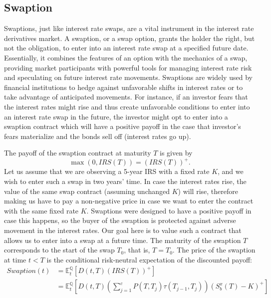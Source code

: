 \documentclass[titlepage, 12pt]{article}
\newcommand{\condexpect}[3]{\mathbb{E}^\mathbb{#1}_{#2}\left[#3\right]}
\begin{document}
	\subsection{Swaption}
	
	Swaptions, just like interest rate swaps, are a vital instrument in the interest rate derivatives market. A swaption, or a swap option, grants the holder the right, but not the obligation, to enter into an interest rate swap at a specified future date. Essentially, it combines the features of an option with the mechanics of a swap, providing market participants with powerful tools for managing interest rate risk and speculating on future interest rate movements. Swaptions are widely used by financial institutions to hedge against unfavorable shifts in interest rates or to take advantage of anticipated movements. For instance, if an investor fears that the interest rates might rise and thus create unfavorable conditions to enter into an interest rate swap in the future, the investor might opt to enter into a swaption contract which will have a positive payoff in the case that investor's fears materialize and the bonds sell off (interest rates go up).
	
	The payoff of the swaption contract at maturity $T$ is given by
	\begin{equation}
		\max\left( 0, IRS(T) \right) = \left(IRS(T)\right)^+.
	\end{equation}
	Let us assume that we are observing a 5-year IRS with a fixed rate $K$, and we wish to enter such a swap in two years' time. In case the interest rates rise, the value of the same swap contract (assuming unchanged $K$) will rise, therefore making us have to pay a non-negative price in case we want to enter the contract with the same fixed rate $K$. Swaptions were designed to have a positive payoff in case this happens, so the buyer of the swaption is protected against adverse movement in the interest rates. Our goal here is to value such a contract that allows us to enter into a swap at a future time. The maturity of the swaption $T$ corresponds to the start of the swap $T_0$, that is, $T=T_0$. The price of the swaption at time $t<T$ is the conditional risk-neutral expectation of the discounted payoff:
	\begin{equation}
		\begin{split}
			Swaption(t) &= \condexpect{Q}{t}{D(t,T)\left(IRS(T)\right)^+} \\
			&= \condexpect{Q}{t}{D(t,T)\left(\sum_{j=1}^c P(T,T_j)\tau(T_{j-1},T_j)\right) \left( S_b^x(T) - K \right)^+}
		\end{split}
	\end{equation}
	
\end{document}
